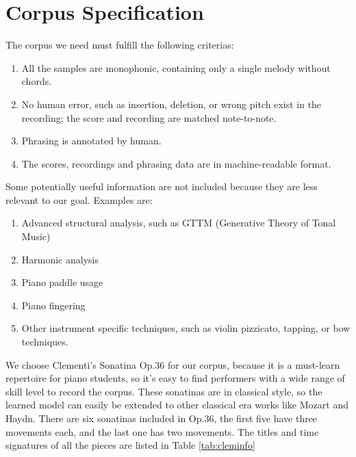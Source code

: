 \section{Corpus Specification}

The corpus we need must fulfill the following criterias:
\begin{enumerate}
   \item All the samples are monophonic, containing only a single melody without chords.
   \item No human error, such as insertion, deletion, or wrong pitch exist in the recording; the score and recording are matched note-to-note.
   \item Phrasing is annotated by human. 
   \item The scores, recordings and phrasing data are in machine-readable format.

\end{enumerate}

Some potentially useful information are not included because they are less relevant to our goal. Examples are:

\begin{enumerate}
   \item Advanced structural analysis, such as GTTM (Generative Theory of Tonal Music)\cite{GTTM}
   \item Harmonic analysis
   \item Piano paddle usage
   \item Piano fingering
   \item Other instrument specific techniques, such as violin pizzicato, tapping, or bow techniques.
\end{enumerate}

We choose Clementi's Sonatina Op.36 for our corpus, because it is a must-learn repertoire for piano students, so it's easy to find performers with a wide range of skill level to record the corpus. These sonatinas are in classical style, so the learned model can easily be extended to other classical era works like Mozart and Haydn. There are six sonatinas included in Op.36, the first five have three movements each, and the last one has two movements. The titles and time signatures of all the pieces are listed in Table \ref{tab:cleminfo}


